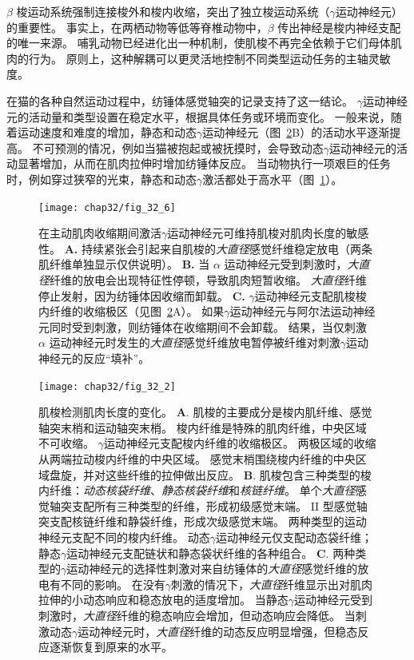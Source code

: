 $ \beta $ 梭运动系统强制连接梭外和梭内收缩，突出了独立梭运动系统（$ \gamma $运动神经元）的重要性。
事实上，在两栖动物等低等脊椎动物中，$ \beta $ 传出神经是梭内神经支配的唯一来源。
哺乳动物已经进化出一种机制，使肌梭不再完全依赖于它们母体肌肉的行为。
原则上，这种解耦可以更灵活地控制不同类型运动任务的主轴灵敏度。


在猫的各种自然运动过程中，纺锤体感觉轴突的记录支持了这一结论。
$ \gamma $运动神经元的活动量和类型设置在稳定水平，根据具体任务或环境而变化。
一般来说，随着运动速度和难度的增加，静态和动态$ \gamma $运动神经元（图~\ref{fig:32_2}B）的活动水平逐渐提高。
不可预测的情况，例如当猫被抱起或被抚摸时，会导致动态$ \gamma $运动神经元的活动显著增加，从而在肌肉拉伸时增加纺锤体反应。 
当动物执行一项艰巨的任务时，例如穿过狭窄的光束，静态和动态$ \gamma $激活都处于高水平（图~\ref{fig:32_6}）。


\begin{figure}[htbp]
	\centering
	\texttt{[image: chap32/fig\_32\_6]}
	\caption{在主动肌肉收缩期间激活$ \gamma $运动神经元可维持肌梭对肌肉长度的敏感性\cite{hunt1951stretch}。 
	\textbf{A.} 持续紧张会引起来自肌梭的\textit{大直径}感觉纤维稳定放电（两条肌纤维单独显示仅供说明）。
	\textbf{B.} 当 $ \alpha $ 运动神经元受到刺激时，\textit{大直径}纤维的放电会出现特征性停顿，导致肌肉短暂收缩。
	\textit{大直径}纤维停止发射，因为纺锤体因收缩而卸载。
	\textbf{C.} $ \gamma $运动神经元支配肌梭梭内纤维的收缩极区（见图~\ref{fig:32_2}A）。
	如果$ \gamma $运动神经元与阿尔法运动神经元同时受到刺激，则纺锤体在收缩期间不会卸载。
	结果，当仅刺激 $ \alpha $ 运动神经元时发生的\textit{大直径}感觉纤维放电暂停被纤维对刺激$ \gamma $运动神经元的反应“填补”。}
	\label{fig:32_6}
\end{figure}


\begin{figure}[htbp]
	\centering
	\texttt{[image: chap32/fig\_32\_2]}
	\caption{肌梭检测肌肉长度的变化。
	\textbf{A}. 肌梭的主要成分是梭内肌纤维、感觉轴突末梢和运动轴突末梢。
	梭内纤维是特殊的肌肉纤维，中央区域不可收缩。
	$ \gamma $运动神经元支配梭内纤维的收缩极区。
	两极区域的收缩从两端拉动梭内纤维的中央区域。
	感觉末梢围绕梭内纤维的中央区域盘旋，并对这些纤维的拉伸做出反应\cite{hulliger1984mammalian}。
	\textbf{B}. 肌梭包含三种类型的梭内纤维：\textit{动态核袋纤维}、\textit{静态核袋纤维}和\textit{核链纤维}。
	单个\textit{大直径}感觉轴突支配所有三种类型的纤维，形成初级感觉末端。
	II 型感觉轴突支配核链纤维和静袋纤维，形成次级感觉末端。
	两种类型的运动神经元支配不同的梭内纤维。
	动态$ \gamma $运动神经元仅支配动态袋纤维；
	静态$ \gamma $运动神经元支配链状和静态袋状纤维的各种组合\cite{boyd1980isolated}。
	\textbf{C}. 两种类型的$ \gamma $运动神经元的选择性刺激对来自纺锤体的\textit{大直径}感觉纤维的放电有不同的影响。
	在没有$ \gamma $刺激的情况下，\textit{大直径}纤维显示出对肌肉拉伸的小动态响应和稳态放电的适度增加。
	当静态$ \gamma $运动神经元受到刺激时，\textit{大直径}纤维的稳态响应会增加，但动态响应会降低。
	当刺激动态$\gamma$运动神经元时，\textit{大直径}纤维的动态反应明显增强，但稳态反应逐渐恢复到原来的水平\cite{brown1966subdivision}。}
	\label{fig:32_2}
\end{figure}


